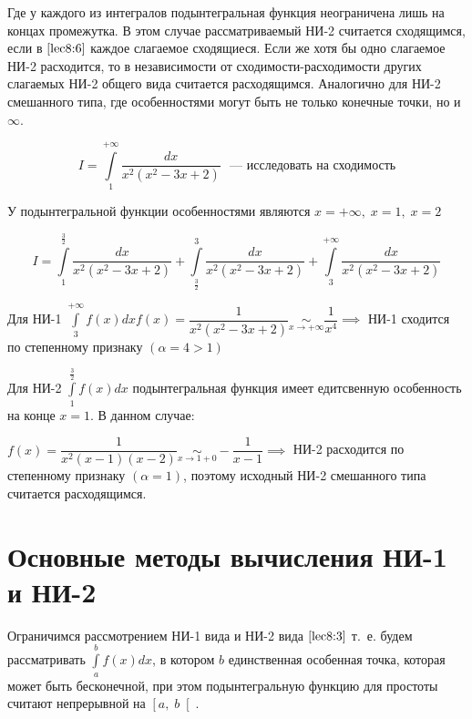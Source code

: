 \documentclass[../../main.tex]{subfiles}
\begin{document}
Где у каждого из интегралов подынтегральная функция неограничена лишь на концах промежутка. В этом случае рассматриваемый НИ-2 считается сходящимся, если в $\eqref{lec8:6}$ каждое слагаемое сходящиеся. Если же хотя бы одно слагаемое НИ-2 расходится, то в независимости от сходимости-расходимости других слагаемых НИ-2 общего вида считается расходящимся. Аналогично для НИ-2 смешанного типа, где особенностями могут быть не только конечные точки, но и $\infty$.

\begin{exmp}
\[I = \int\limits_{1}^{+\infty}\dfrac{dx}{x^2(x^2 - 3x + 2)} \text{ ~--- исследовать на сходимость} \]

У подынтегральной функции особенностями являются $x = +\infty,\; x = 1,\; x = 2$

\[I = \int\limits_{1}^{\frac{3}{2}}\dfrac{dx}{x^2(x^2 - 3x +2 )} + \int\limits_{\frac{3}{2}}^{3}\dfrac{dx}{x^2(x^2 - 3x +2 )} + \int\limits_{3}^{+\infty}\dfrac{dx}{x^2(x^2 - 3x +2 )}\]

Для НИ-1 $\displaystyle\int\limits_{3}^{+\infty}f(x)dx f(x) = \dfrac{1}{x^2(x^2 -3x + 2)} \underset{x \to +\infty} \sim \dfrac{1}{x^4} \implies$ НИ-1 сходится по степенному признаку $\left(\alpha = 4 > 1\right)$

Для НИ-2 $\displaystyle\int\limits_{1}^{\frac{3}{2}}f(x)dx$ подынтегральная функция имеет едитсвенную особенность на конце $x = 1$. В данном случае:

$f(x) = \dfrac{1}{x^2(x-1)(x-2)} \underset{x \to 1 + 0}\sim -\dfrac{1}{x - 1} \implies$ НИ-2 расходится по степенному признаку $\left(\alpha = 1\right)$, поэтому исходный НИ-2 смешанного типа считается расходящимся. 
\end{exmp}

\section{Основные методы вычисления НИ-1 и НИ-2}

Ограничимся рассмотрением НИ-1 вида и НИ-2 вида $\eqref{lec8:3}$ т.~е. будем рассматривать $\displaystyle\int\limits_{a}^{b}f(x)dx$, в котором $b$ единственная особенная точка, которая может быть бесконечной, при этом подынтегральную функцию для простоты считают непрерывной на $\left[a,\; b\right[$. 
\end{document}
